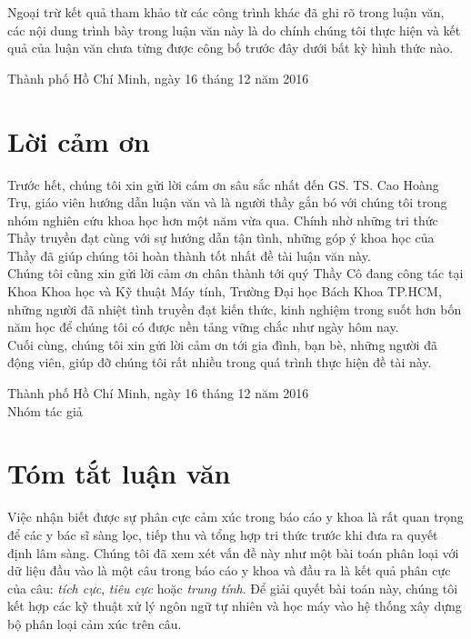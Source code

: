 \documentclass[a4paper, 12pt]{article}
\theoremstyle{definition}
\newcommand{\tichcuc}{\textit{tích cực}\xspace}
\newcommand{\tieucuc}{\textit{tiêu cực}\xspace}
\newcommand{\trungtinh}{\textit{trung tính}\xspace}
\begin{document}
Ngoại trừ kết quả tham khảo từ các công trình khác đã ghi rõ trong luận văn, các nội dung trình bày trong luận văn này là do chính chúng tôi thực hiện và kết quả của luận văn chưa từng được công bố trước đây dưới bất kỳ hình thức nào.\\

\begin{flushright}
Thành phố Hồ Chí Minh, ngày 16 tháng 12 năm 2016
\end{flushright}

\pagebreak
\section*{Lời cảm ơn}
Trước hết, chúng tôi xin gửi lời cám ơn sâu sắc nhất đến GS. TS. Cao Hoàng Trụ, giáo viên hướng dẫn luận văn và là người thầy gắn bó với chúng tôi trong nhóm nghiên cứu khoa học hơn một năm vừa qua. Chính nhờ những tri thức Thầy truyền đạt cùng với sự hướng dẫn tận tình, những góp ý khoa học của Thầy đã giúp chúng tôi hoàn thành tốt nhất đề tài luận văn này.\\

Chúng tôi cũng xin gửi lời cảm ơn chân thành tới quý Thầy Cô đang công tác tại Khoa Khoa học và Kỹ thuật Máy tính, Trường Đại học Bách Khoa TP.HCM, những người đã nhiệt tình truyền đạt kiến thức, kinh nghiệm trong suốt hơn bốn năm học để chúng tôi có được nền tảng vững chắc như ngày hôm nay.\\

Cuối cùng, chúng tôi xin gửi lời cảm ơn tới gia đình, bạn bè, những người đã động viên, giúp đỡ chúng tôi rất nhiều trong quá trình thực hiện đề tài này.\\

\begin{flushright}
Thành phố Hồ Chí Minh, ngày 16 tháng 12 năm 2016\\

Nhóm tác giả
\end{flushright}

\pagebreak
\section*{Tóm tắt luận văn}
Việc nhận biết được sự phân cực cảm xúc trong báo cáo y khoa là rất quan trọng để các y bác sĩ sàng lọc, tiếp thu và tổng hợp tri thức trước khi đưa ra quyết định lâm sàng. Chúng tôi đã xem xét vấn đề này như một bài toán phân loại với dữ liệu đầu vào là một câu trong báo cáo y khoa và đầu ra là kết quả phân cực của câu: \tichcuc, \tieucuc hoặc \trungtinh. Để giải quyết bài toán này, chúng tôi kết hợp các kỹ thuật xử lý ngôn ngữ tự nhiên và học máy vào hệ thống xây dựng bộ phân loại cảm xúc trên câu.\\
\end{document}

